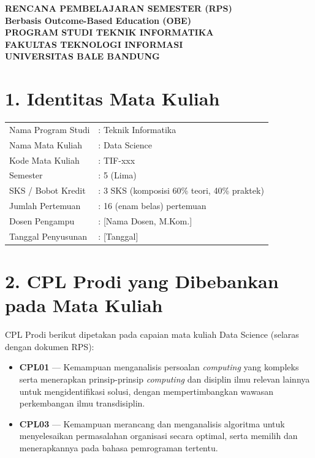 \documentclass[12pt,a4paper]{article}
\begin{document}
\begin{center}
\textbf{\Large RENCANA PEMBELAJARAN SEMESTER (RPS)}\\
\textbf{Berbasis Outcome-Based Education (OBE)}\\[0.5cm]
\textbf{PROGRAM STUDI TEKNIK INFORMATIKA}\\
\textbf{FAKULTAS TEKNOLOGI INFORMASI}\\
\textbf{UNIVERSITAS BALE BANDUNG}\\
\end{center}

\vspace{1cm}

\section*{1. Identitas Mata Kuliah}
\begin{tabular}{ll}
Nama Program Studi & : Teknik Informatika \\
Nama Mata Kuliah & : Data Science \\
Kode Mata Kuliah & : TIF-xxx \\
Semester & : 5 (Lima) \\
SKS / Bobot Kredit & : 3 SKS (komposisi 60\% teori, 40\% praktek) \\
Jumlah Pertemuan & : 16 (enam belas) pertemuan \\
Dosen Pengampu & : [Nama Dosen, M.Kom.] \\
Tanggal Penyusunan & : [Tanggal] \\
\end{tabular}

\vspace{0.5cm}

\section*{2. CPL Prodi yang Dibebankan pada Mata Kuliah}

CPL Prodi berikut dipetakan pada capaian mata kuliah Data Science (selaras dengan dokumen RPS):

\begin{itemize}[leftmargin=*]
  \item \textbf{CPL01} --- Kemampuan menganalisis persoalan \textit{computing} yang kompleks serta menerapkan prinsip-prinsip \textit{computing} dan disiplin ilmu relevan lainnya untuk mengidentifikasi solusi, dengan mempertimbangkan wawasan perkembangan ilmu transdisiplin.

  \item \textbf{CPL03} --- Kemampuan merancang dan menganalisis algoritma untuk menyelesaikan permasalahan organisasi secara optimal, serta memilih dan menerapkannya pada bahasa pemrograman tertentu.
\end{itemize}
\end{document}
